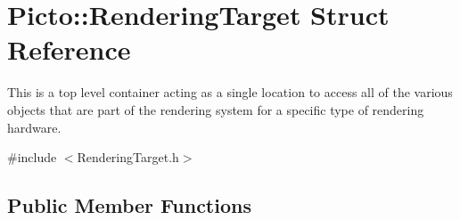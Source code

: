 \hypertarget{struct_picto_1_1_rendering_target}{\section{Picto\-:\-:Rendering\-Target Struct Reference}
\label{struct_picto_1_1_rendering_target}
}


This is a top level container acting as a single location to access all of the various objects that are part of the rendering system for a specific type of rendering hardware.  




{\ttfamily \#include $<$Rendering\-Target.\-h$>$}

\subsection*{Public Member Functions}
